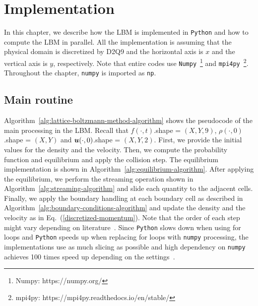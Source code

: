 \chapter{Implementation}
\vspace{-8mm}
In this chapter, we describe how the LBM is implemented in {\tt Python}
and how to compute the LBM in parallel.
All the implementation is assuming that
the physical domain is discretized by D2Q9
and the horizontal axis is $x$ and 
the vertical axis is $y$, respectively.
Note that entire codes use
{\tt Numpy}~\footnote{Numpy: https://numpy.org/}
and {\tt mpi4py}~\footnote{mpi4py: https://mpi4py.readthedocs.io/en/stable/}.
Throughout the chapter, {\tt numpy} is imported as {\tt np}.

\section{Main routine}
Algorithm~\ref{alg:lattice-boltzmann-method-algorithm}
shows the pseudocode of the main processing in the LBM.
Recall that $f(\cdot, t)$.shape = $(X, Y, 9)$,
$\rho(\cdot, 0)$.shape = $(X, Y)$ and $\boldsymbol{u}(\cdot, 0)$.shape = $(X, Y, 2)$.
First, we provide the initial values for the density and the velocity.
Then, we compute the probability function and equilibrium and
apply the collision step.
The equilibrium implementation is shown in Algorithm~\ref{alg:equilibrium-algorithm}.
After applying the equilibrium, we perform the
streaming operation shown in Algorithm~\ref{alg:streaming-algorithm}
and slide each quantity to the adjacent cells.
Finally, we apply the boundary handling at each boundary cell as 
described in Algorithm~\ref{alg:boundary-conditions-algorithm}
and update the density and the velocity as in Eq.~(\ref{discretized-momentum}).
Note that the order of each step might vary depending on literature~\cite{timm2016lattice, succi2018lattice}.
Since {\tt Python} slows down when using for loops
and {\tt Python} speeds up when replacing for loops with {\tt numpy} processing,
the implementations use as much slicing as possible
and high dependency on {\tt numpy} achieves 100 times speed up depending on
the settings~\cite{van2011numpy}. 

